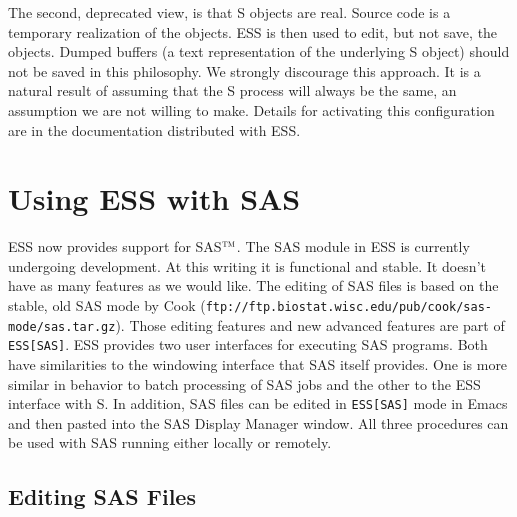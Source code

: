 \documentclass{article}
\newcommand{\stexttt}[1]{{\small\texttt{#1}}}
\newcommand{\ssf}[1]{{\small\sf{#1}}}
\newcommand{\tm}{$^{\mbox{\scriptsize\sc tm}}$}
\newenvironment{Salltt}{\small\begin{alltt}}{\end{alltt}}
\newcommand{\file}[1]{`\stexttt{#1}'}
\begin{document}
The second, deprecated view, is that S objects are real.  Source code
is a temporary realization of the objects.  ESS is then used to edit, but
not save, the objects.  Dumped buffers
(a text representation of the underlying S object)
should not be saved in this philosophy.  We strongly discourage this approach.
It is a
natural result of assuming that the S process will always be the
same, an assumption we are not willing to make.
Details for activating this configuration are in the
documentation distributed with ESS.


\section{Using ESS with SAS}
\label{sec:SAS}

ESS now provides support for SAS\tm.  The SAS module in ESS is
currently undergoing development.  At this writing it is functional
and stable.  It doesn't have as many features as we would like.  The
editing of SAS files is based on the stable, old SAS mode by Cook
(\stexttt{ftp://ftp.biostat.wisc.edu/pub/cook/sas-mode/sas.tar.gz}).
Those editing features and new advanced features are part of
\stexttt{ESS[SAS]}.  ESS provides two user interfaces for executing SAS
programs.  Both have similarities to the
windowing interface that SAS itself provides.
One is more similar in behavior to batch processing of SAS jobs
and the other to the ESS interface with S.  In addition, SAS files can be
edited in \stexttt{ESS[SAS]} mode in Emacs and then pasted into the SAS
Display Manager \ssf{Program Editor} window.  All three procedures can
be used with SAS running either locally or remotely.

\subsection{Editing SAS Files}
\label{sec:SAS:edit}
\end{document}
